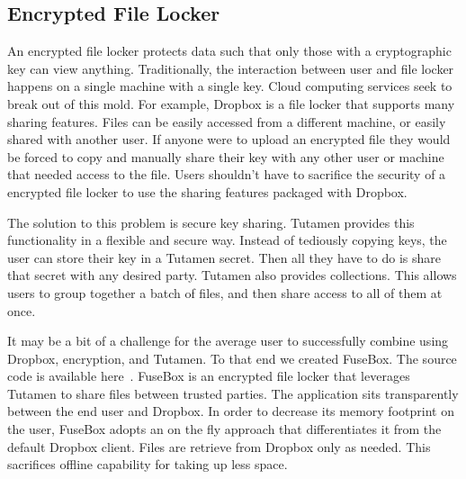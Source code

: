 \subsection{Encrypted File Locker}
An encrypted file locker protects data such that only those with a
cryptographic key can view anything. Traditionally, the interaction 
between user and file locker happens on a single machine with a single 
key. Cloud computing services seek to break out of this mold. For example,
Dropbox is a file locker that supports many sharing features. Files
can be easily accessed from a different machine, or easily shared with
another user. If anyone were to upload an encrypted file they
would be forced to copy and manually share their key with any other
user or machine that needed access to the file. Users shouldn't have
to sacrifice the security of a encrypted file locker to use the
sharing features packaged with Dropbox. 

The solution to this problem is secure key sharing. Tutamen provides
this functionality in a flexible and secure way. Instead of tediously
copying keys, the user can store their key in a Tutamen
secret. Then all they have to do is share that secret with any desired
party. Tutamen also provides collections. This allows users to group
together a batch of files, and then share access to all of them at
once. 

It may be a bit of a challenge for the average user to successfully
combine using Dropbox, encryption, and Tutamen. To that end we
created FuseBox. The source code is available here~\cite{fusebox}.
FuseBox is an encrypted file locker that leverages Tutamen to share
files between trusted parties. The application sits transparently 
between the end user and Dropbox. In order to decrease its memory
footprint on the user,
FuseBox adopts an on the fly approach that differentiates it from the
default Dropbox client. Files are retrieve from Dropbox only as
needed. This sacrifices offline capability for taking up less space. 

